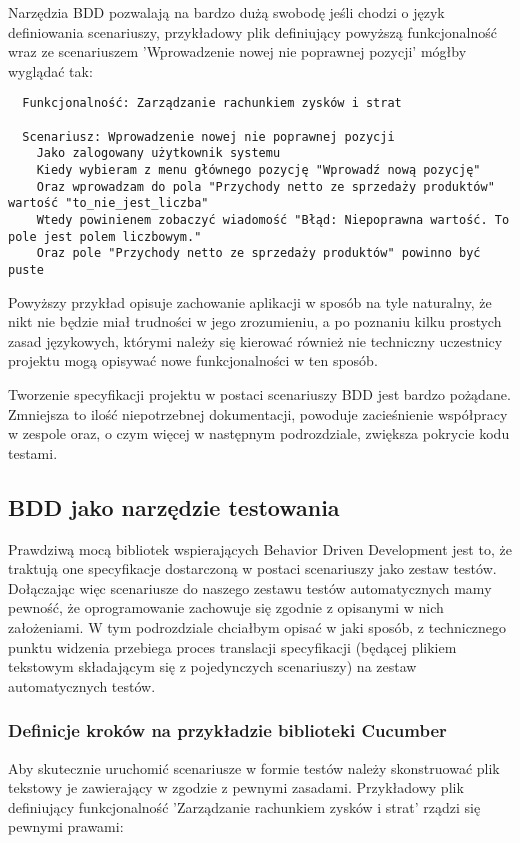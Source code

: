      Narzędzia BDD pozwalają na bardzo dużą swobodę jeśli chodzi o język definiowania scenariuszy, przykładowy plik definiujący powyższą funkcjonalność wraz ze scenariuszem 'Wprowadzenie nowej nie poprawnej pozycji' mógłby wyglądać tak:
      
\begin{verbatim}
  Funkcjonalność: Zarządzanie rachunkiem zysków i strat
  
  Scenariusz: Wprowadzenie nowej nie poprawnej pozycji
    Jako zalogowany użytkownik systemu
    Kiedy wybieram z menu głównego pozycję "Wprowadź nową pozycję"
    Oraz wprowadzam do pola "Przychody netto ze sprzedaży produktów" wartość "to_nie_jest_liczba"
    Wtedy powinienem zobaczyć wiadomość "Błąd: Niepoprawna wartość. To pole jest polem liczbowym."
    Oraz pole "Przychody netto ze sprzedaży produktów" powinno być puste
\end{verbatim}

    Powyższy przykład opisuje zachowanie aplikacji w sposób na tyle naturalny, że nikt nie będzie miał trudności w jego zrozumieniu, a po poznaniu kilku prostych zasad językowych, którymi należy się kierować również nie techniczny uczestnicy projektu mogą opisywać nowe funkcjonalności w ten sposób.
    
    Tworzenie specyfikacji projektu w postaci scenariuszy BDD jest bardzo pożądane. Zmniejsza to ilość niepotrzebnej dokumentacji, powoduje zacieśnienie współpracy w zespole oraz, o czym więcej w następnym podrozdziale, zwiększa pokrycie kodu testami.
    
    \subsection{BDD jako narzędzie testowania}
      Prawdziwą mocą bibliotek wspierających Behavior Driven Development jest to, że traktują one specyfikacje dostarczoną w postaci scenariuszy jako zestaw testów. Dołączając więc scenariusze do naszego zestawu testów automatycznych mamy pewność, że oprogramowanie zachowuje się zgodnie z opisanymi w nich założeniami. W tym podrozdziale chciałbym opisać w jaki sposób, z technicznego punktu widzenia przebiega proces translacji specyfikacji (będącej plikiem tekstowym składającym się z pojedynczych scenariuszy) na zestaw automatycznych testów.
      \subsubsection{Definicje kroków na przykładzie biblioteki Cucumber}
        Aby skutecznie uruchomić scenariusze w formie testów należy skonstruować plik tekstowy je zawierający w zgodzie z pewnymi zasadami. Przykładowy plik definiujący funkcjonalność 'Zarządzanie rachunkiem zysków i strat' rządzi się pewnymi prawami:
        
